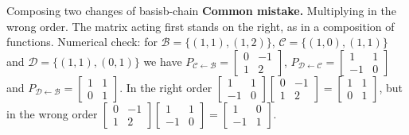 \documentclass[11pt]{article}
\begin{document}
\begin{exmp}{Composing two changes of basis}{b-chain}
\textbf{Common mistake.} Multiplying in the wrong order. The matrix acting first stands on the right, as in a composition of functions. Numerical check: for $\mathcal{B}=\{(1,1),(1,2)\}$, $\mathcal{C}=\{(1,0),(1,1)\}$ and $\mathcal{D}=\{(1,1),(0,1)\}$ we have $P_{\mathcal{C}\leftarrow\mathcal{B}}=\begin{bmatrix}0&-1\\1&2\end{bmatrix}$, $P_{\mathcal{D}\leftarrow\mathcal{C}}=\begin{bmatrix}1&1\\-1&0\end{bmatrix}$ and $P_{\mathcal{D}\leftarrow\mathcal{B}}=\begin{bmatrix}1&1\\0&1\end{bmatrix}$. In the right order $\begin{bmatrix}1&1\\-1&0\end{bmatrix}\begin{bmatrix}0&-1\\1&2\end{bmatrix}=\begin{bmatrix}1&1\\0&1\end{bmatrix}$, but in the wrong order $\begin{bmatrix}0&-1\\1&2\end{bmatrix}\begin{bmatrix}1&1\\-1&0\end{bmatrix}=\begin{bmatrix}1&0\\-1&1\end{bmatrix}$.
\end{exmp}
\end{document}
